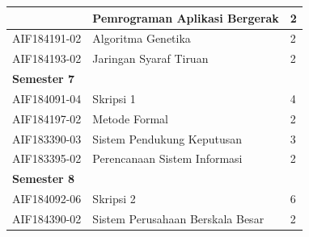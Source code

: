 \documentclass[a4paper,twoside]{article}
\begin{document}
\begin{enumerate}
\begin{enumerate}
\begin{itemize}
\begin{table}[H]
\begin{tabular}{|p{2.85cm}|p{7.95cm}|p{1.75cm}|}
					 & Pemrograman Aplikasi Bergerak           & 2   \\ \hline
					AIF184191-02 & Algoritma Genetika                      & 2   \\ \hline
					AIF184193-02 & Jaringan Syaraf Tiruan                  & 2   \\ \hline
					\multicolumn{3}{|l|}{\textbf{Semester 7}}                    \\ \hline
					AIF184091-04 & Skripsi 1                               & 4   \\ \hline
					AIF184197-02 & Metode Formal                           & 2   \\ \hline
					AIF183390-03 & Sistem Pendukung Keputusan              & 3   \\ \hline
					AIF183395-02 & Perencanaan Sistem Informasi            & 2   \\ \hline
					\multicolumn{3}{|l|}{\textbf{Semester 8}}                    \\ \hline
					AIF184092-06 & Skripsi 2                               & 6   \\ \hline
					AIF184390-02 & Sistem Perusahaan Berskala Besar        & 2   \\ \hline
							\end{tabular}
						\label{tab:MataKuliahTransisi}
					\end{table}
					

\end{itemize}
\end{enumerate}
\end{enumerate}
\end{document}
